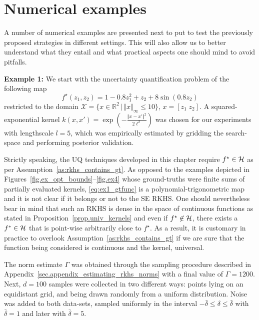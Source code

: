 \section{Numerical examples}

A number of numerical examples are presented next to put to test the previously proposed strategies in different settings. This will also allow us to better understand what they entail and what practical aspects one should mind to avoid pitfalls.

\textbf{Example 1:} We start with the uncertainty quantification problem of the following map
\begin{equation}
	\label{eq:ex1_gtfunc}
	f^\star(z_1,z_2) = 1 - 0.8 z_1^2 + z_2 + 8 \sin(0.8z_2)
\end{equation}
restricted to the domain $\mathcal{X} = \{ x \in \mathbb{R}^2 \, | \, \Vert x \Vert_\infty \leq 10 \}$, $x = [z_1 \; z_2]$. A squared-exponential kernel $k(x,x') = \exp \left(-\frac{\Vert x - x'\Vert^2}{2\ell^2}\right)$ was chosen for our experiments with lengthscale $l=5$, which was empirically estimated by gridding the search-space and performing posterior validation.

Strictly speaking, the UQ techniques developed in this chapter require $f^\star \in \mathcal{H}$ as per Assumption~\ref{as:rkhs_contains_gt}. As opposed to the examples depicted in Figures~\ref{fig.ex_opt_bounds}--\ref{fig.ex4} whose ground-truths were finite sums of partially evaluated kernels, \eqref{eq:ex1_gtfunc} is a polynomial-trigonometric map and it is not clear if it belongs or not to the SE RKHS. One should nevertheless bear in mind that such an RKHS is dense in the space of continuous functions as stated in Proposition~\ref{prop.univ_kernels} and even if $f^\star \not\in \mathcal{H}$, there exists a $f^* \in \mathcal{H}$ that is point-wise arbitrarily close to $f^\star$. As a result, it is customary in practice to overlook Assumption~\ref{as:rkhs_contains_gt} if we are sure that the function being considered is continuous and the kernel, universal.
 
The norm estimate $\Gamma$ was obtained through the sampling procedure described in Appendix~\ref{sec.appendix_estimating_rkhs_norms} with a final value of $\Gamma=1200$. Next, $d=100$ samples were collected in two different ways: points lying on an equidistant grid, and being drawn randomly from a uniform distribution. Noise was added to both data-sets, sampled uniformly in the interval $-\bar\delta \leq \delta \leq \bar\delta$ with $\bar \delta = 1$ and later with $\bar \delta = 5$.

